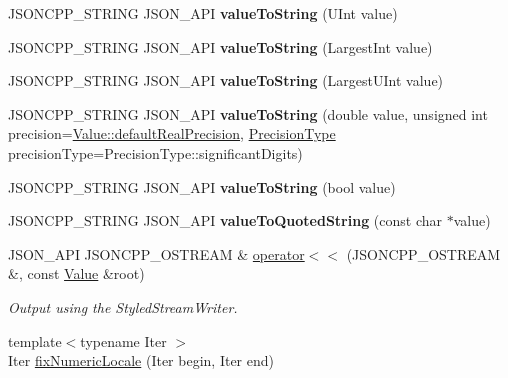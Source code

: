 \begin{DoxyCompactItemize}
\mbox{\label{namespaceJson_a99bc401be7f8a09a8439f3e7219b1f12}} 
J\+S\+O\+N\+C\+P\+P\+\_\+\+S\+T\+R\+I\+NG J\+S\+O\+N\+\_\+\+A\+PI {\bfseries value\+To\+String} (U\+Int value)
\item 
\mbox{\label{namespaceJson_a4732517cb28d203cfd4354d05952a81b}} 
J\+S\+O\+N\+C\+P\+P\+\_\+\+S\+T\+R\+I\+NG J\+S\+O\+N\+\_\+\+A\+PI {\bfseries value\+To\+String} (Largest\+Int value)
\item 
\mbox{\label{namespaceJson_a6283ea3db02efe9104ae6baff698245a}} 
J\+S\+O\+N\+C\+P\+P\+\_\+\+S\+T\+R\+I\+NG J\+S\+O\+N\+\_\+\+A\+PI {\bfseries value\+To\+String} (Largest\+U\+Int value)
\item 
\mbox{\label{namespaceJson_ac02258b61007c42eb3b317c0b210dffc}} 
J\+S\+O\+N\+C\+P\+P\+\_\+\+S\+T\+R\+I\+NG J\+S\+O\+N\+\_\+\+A\+PI {\bfseries value\+To\+String} (double value, unsigned int precision=\hyperlink{classJson_1_1Value_aaece556f282980ec2be4b39b9576075f}{Value\+::default\+Real\+Precision}, \hyperlink{namespaceJson_af6e1447a3c43e3a62e11050dd0a11ce8}{Precision\+Type} precision\+Type=Precision\+Type\+::significant\+Digits)
\item 
\mbox{\label{namespaceJson_a0a706a1fffba4fe8a8c1ef75b2dbbfab}} 
J\+S\+O\+N\+C\+P\+P\+\_\+\+S\+T\+R\+I\+NG J\+S\+O\+N\+\_\+\+A\+PI {\bfseries value\+To\+String} (bool value)
\item 
\mbox{\label{namespaceJson_aaf777a6923bcb4cf63a2729973fe5315}} 
J\+S\+O\+N\+C\+P\+P\+\_\+\+S\+T\+R\+I\+NG J\+S\+O\+N\+\_\+\+A\+PI {\bfseries value\+To\+Quoted\+String} (const char $\ast$value)
\item 
J\+S\+O\+N\+\_\+\+A\+PI J\+S\+O\+N\+C\+P\+P\+\_\+\+O\+S\+T\+R\+E\+AM \& \hyperlink{namespaceJson_a975d1dbca8aa7a06f38d373edcb9081c}{operator$<$$<$} (J\+S\+O\+N\+C\+P\+P\+\_\+\+O\+S\+T\+R\+E\+AM \&, const \hyperlink{classJson_1_1Value}{Value} \&root)
\begin{DoxyCompactList}\small\item\em Output using the Styled\+Stream\+Writer. \end{DoxyCompactList}\item 
{\footnotesize template$<$typename Iter $>$ }\\Iter \hyperlink{namespaceJson_a4f93f184c2890cb99b07afeed10a89ec}{fix\+Numeric\+Locale} (Iter begin, Iter end)

\end{DoxyCompactItemize}
